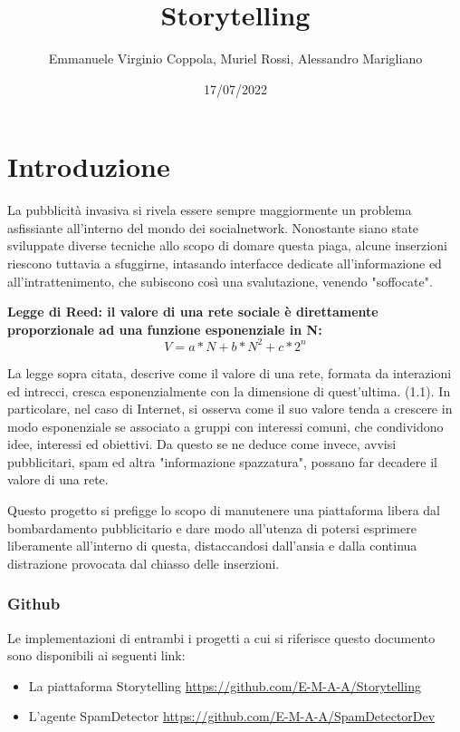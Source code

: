 \documentclass{report}
\title{Storytelling} %
\author{Emmanuele Virginio Coppola, Muriel Rossi, Alessandro Marigliano} %
\date{17/07/2022}
\begin{document}
    \maketitle %

    \tableofcontents
    \chapter{Introduzione} %
    
    La pubblicità invasiva si rivela essere sempre maggiormente un problema asfissiante all'interno del mondo dei socialnetwork. Nonostante siano state sviluppate diverse tecniche
    allo scopo di domare questa piaga, alcune inserzioni riescono tuttavia a sfuggirne, intasando interfacce dedicate all'informazione ed 
    all'intrattenimento, che subiscono così una svalutazione, venendo "soffocate".
    \newline

    \textbf{Legge di Reed: il valore di una rete sociale è direttamente proporzionale ad una funzione esponenziale in N:}
    \begin{equation} %
        V=a*N+b*N^2 + c*2^n
    \end{equation}
    

    La legge sopra citata, descrive come il valore di una rete, formata da interazioni ed intrecci, cresca esponenzialmente con la dimensione di quest'ultima. (1.1).
    In particolare, nel caso di Internet, si osserva come il suo valore tenda a crescere in modo esponenziale se associato a gruppi con interessi
     comuni, che condividono idee, interessi ed obiettivi.
    Da questo se ne deduce come invece, avvisi pubblicitari, spam ed altra "informazione spazzatura", possano far decadere il valore di una rete.
    
    Questo progetto si prefigge lo scopo di manutenere una piattaforma libera dal bombardamento pubblicitario e dare modo all'utenza di potersi esprimere liberamente
    all'interno di questa, distaccandosi dall'ansia e dalla continua distrazione provocata dal chiasso delle inserzioni.
    \newline
    \subsection{Github}
    Le implementazioni di entrambi i progetti a cui si riferisce questo documento sono disponibili ai seguenti link:
    \begin{itemize}
        \item La piattaforma Storytelling \href{https://github.com/E-M-A-A/Storytelling}{https://github.com/E-M-A-A/Storytelling}
        \item L'agente SpamDetector \href{https://github.com/E-M-A-A/SpamDetectorDev}{https://github.com/E-M-A-A/SpamDetectorDev}
    \end{itemize}
\end{document}
